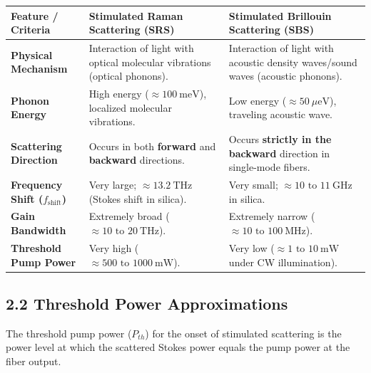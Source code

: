 \begin{table}[H]
\centering
\begin{tabular}{|p{}|p{}|p{}|}
\hline
Feature / Criteria & Stimulated Raman Scattering (SRS) & Stimulated Brillouin Scattering (SBS) \\
\hline
\textbf{Physical Mechanism} & Interaction of light with optical molecular vibrations (optical phonons). & Interaction of light with acoustic density waves/sound waves (acoustic phonons). \\
\hline
\textbf{Phonon Energy} & High energy ($\approx 100\ \text{meV}$), localized molecular vibrations. & Low energy ($\approx 50\ \mu\text{eV}$), traveling acoustic wave. \\
\hline
\textbf{Scattering Direction} & Occurs in both \textbf{forward} and \textbf{backward} directions. & Occurs \textbf{strictly in the backward} direction in single-mode fibers. \\
\hline
\textbf{Frequency Shift ($f_{\text{shift}}$)} & Very large; $\approx 13.2\ \text{THz}$ (Stokes shift in silica). & Very small; $\approx 10 \text{ to } 11\ \text{GHz}$ in silica. \\
\hline
\textbf{Gain Bandwidth} & Extremely broad ($\approx 10 \text{ to } 20\ \text{THz}$). & Extremely narrow ($\approx 10 \text{ to } 100\ \text{MHz}$). \\
\hline
\textbf{Threshold Pump Power} & Very high ($\approx 500 \text{ to } 1000\ \text{mW}$). & Very low ($\approx 1 \text{ to } 10\ \text{mW}$ under CW illumination). \\
\hline
\end{tabular}
\end{table}


\subsection{2.2 Threshold Power Approximations}
The threshold pump power ($P_{th}$) for the onset of stimulated scattering is the power level at which the scattered Stokes power equals the pump power at the fiber output.

